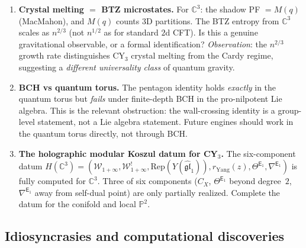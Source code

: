 \documentclass[11pt]{article}
\newcommand{\cW}{\mathcal{W}}
\newcommand{\fgl}{\mathfrak{gl}}
\newcommand{\C}{\mathbb{C}}
\newcommand{\bP}{\mathbb{P}}
\newcommand{\Eone}{\mathsf{E}_1}
\newcommand{\Rep}{\mathrm{Rep}}
\begin{document}
\begin{enumerate}[label=\textbf{Q\arabic*.}]
\item \textbf{Crystal melting $=$ BTZ microstates.} For $\C^3$: the shadow PF $= M(q)$ (MacMahon),
 and $M(q)$ counts $3$D partitions. The BTZ entropy from $\C^3$ scales as $n^{2/3}$ (not $n^{1/2}$
 as for standard $2$d CFT). Is this a genuine gravitational observable, or a formal identification?
 \emph{Observation}: the $n^{2/3}$ growth rate distinguishes CY$_3$ crystal melting from the
 Cardy regime, suggesting a \emph{different universality class} of quantum gravity.

\item \textbf{BCH vs quantum torus.} The pentagon identity holds \emph{exactly} in the quantum torus
 but \emph{fails} under finite-depth BCH in the pro-nilpotent Lie algebra. This is the relevant obstruction:
 the wall-crossing identity is a group-level statement, not a Lie algebra statement. Future
 engines should work in the quantum torus directly, not through BCH.

\item \textbf{The holographic modular Koszul datum for CY$_3$.} The six-component datum
 $H(\C^3) = (\cW_{1+\infty}, \cW^!_{1+\infty}, \Rep(Y(\widehat{\fgl}_1)), r_{\mathrm{Yang}}(z),
 \Theta^{\Eone}, \nabla^{\Eone})$ is fully computed for $\C^3$. Three of six components
 ($C_X$, $\Theta^{\Eone}$ beyond degree~$2$, $\nabla^{\Eone}$ away from self-dual point) are
 only partially realized. Complete the datum for the conifold and local $\bP^2$.
\end{enumerate}

\subsection{Idiosyncrasies and computational discoveries}
\label{subsec:idiosyncrasies}
\end{document}
